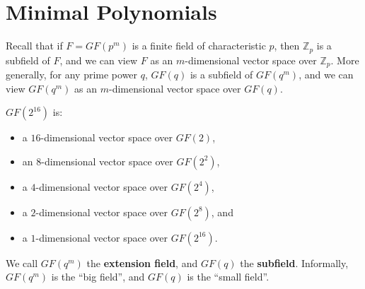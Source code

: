 \section{Minimal Polynomials}
Recall that if $ F=GF(p^m) $ is a finite field of characteristic $ p $,
then $ \mathbb{Z}_p $ is a subfield of $ F $, and we can view
$ F $ as an $ m $-dimensional vector space over $ \mathbb{Z}_p $. More
generally, for any prime power $ q $, $ GF(q) $ is a subfield of $ GF(q^m) $,
and we can view $ GF(q^m) $ as an $ m $-dimensional vector space over $ GF(q) $.
\begin{exbox}
    \begin{example}
        $ GF(2^{16}) $ is:
        \begin{itemize}
            \item a $ 16 $-dimensional vector space over $ GF(2) $,
            \item an $ 8 $-dimensional vector space over $ GF(2^2) $,
            \item a $ 4 $-dimensional vector space over $ GF(2^4) $,
            \item a $ 2 $-dimensional vector space over $ GF(2^8) $, and
            \item a $ 1 $-dimensional vector space over $ GF(2^{16}) $.
        \end{itemize}
    \end{example}
\end{exbox}
We call $ GF(q^m) $ the \textbf{extension field}, and $ GF(q) $ the \textbf{subfield}.
Informally, $ GF(q^m) $ is the ``big field'', and $ GF(q) $ is the ``small field''.

